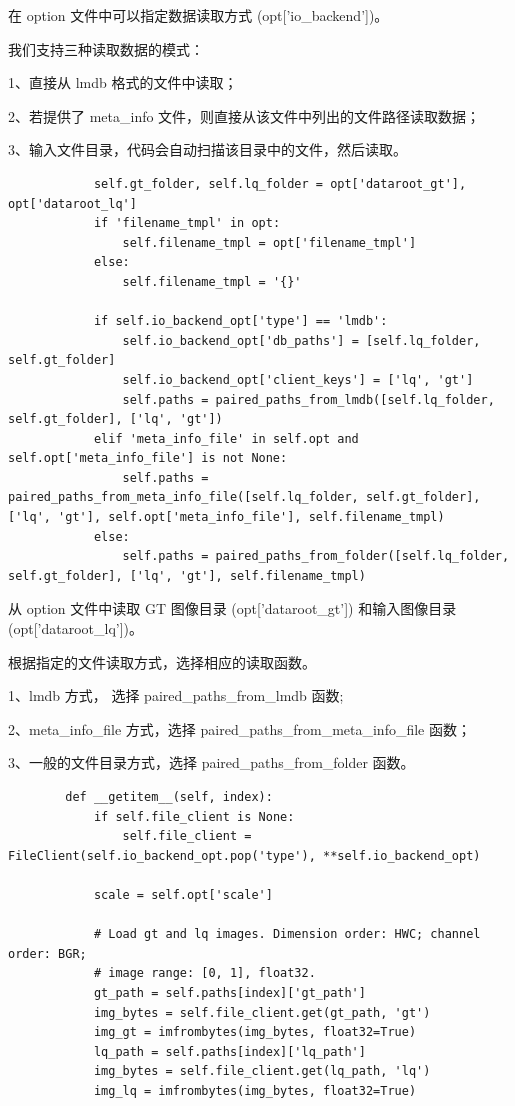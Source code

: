 \documentclass[../main.tex]{subfiles}
\begin{document}
在 option 文件中可以指定数据读取方式 (opt['io\_backend'])。

我们支持三种读取数据的模式：

1、直接从 lmdb 格式的文件中读取；

2、若提供了 meta\_info 文件，则直接从该文件中列出的文件路径读取数据；

3、输入文件目录，代码会自动扫描该目录中的文件，然后读取。


\begin{verbatim}
            self.gt_folder, self.lq_folder = opt['dataroot_gt'], opt['dataroot_lq']
            if 'filename_tmpl' in opt:
                self.filename_tmpl = opt['filename_tmpl']
            else:
                self.filename_tmpl = '{}'

            if self.io_backend_opt['type'] == 'lmdb':
                self.io_backend_opt['db_paths'] = [self.lq_folder, self.gt_folder]
                self.io_backend_opt['client_keys'] = ['lq', 'gt']
                self.paths = paired_paths_from_lmdb([self.lq_folder, self.gt_folder], ['lq', 'gt'])
            elif 'meta_info_file' in self.opt and self.opt['meta_info_file'] is not None:
                self.paths = paired_paths_from_meta_info_file([self.lq_folder, self.gt_folder], ['lq', 'gt'], self.opt['meta_info_file'], self.filename_tmpl)
            else:
                self.paths = paired_paths_from_folder([self.lq_folder, self.gt_folder], ['lq', 'gt'], self.filename_tmpl)
    \end{verbatim}

从 option 文件中读取 GT 图像目录 (opt['dataroot\_gt']) 和输入图像目录 (opt['dataroot\_lq'])。

根据指定的文件读取方式，选择相应的读取函数。

1、lmdb 方式， 选择 paired\_paths\_from\_lmdb 函数;

2、meta\_info\_file 方式，选择 paired\_paths\_from\_meta\_info\_file 函数；

3、一般的文件目录方式，选择 paired\_paths\_from\_folder 函数。

\begin{verbatim}
        def __getitem__(self, index):
            if self.file_client is None:
                self.file_client = FileClient(self.io_backend_opt.pop('type'), **self.io_backend_opt)

            scale = self.opt['scale']

            # Load gt and lq images. Dimension order: HWC; channel order: BGR;
            # image range: [0, 1], float32.
            gt_path = self.paths[index]['gt_path']
            img_bytes = self.file_client.get(gt_path, 'gt')
            img_gt = imfrombytes(img_bytes, float32=True)
            lq_path = self.paths[index]['lq_path']
            img_bytes = self.file_client.get(lq_path, 'lq')
            img_lq = imfrombytes(img_bytes, float32=True)
    \end{verbatim}
\end{document}
